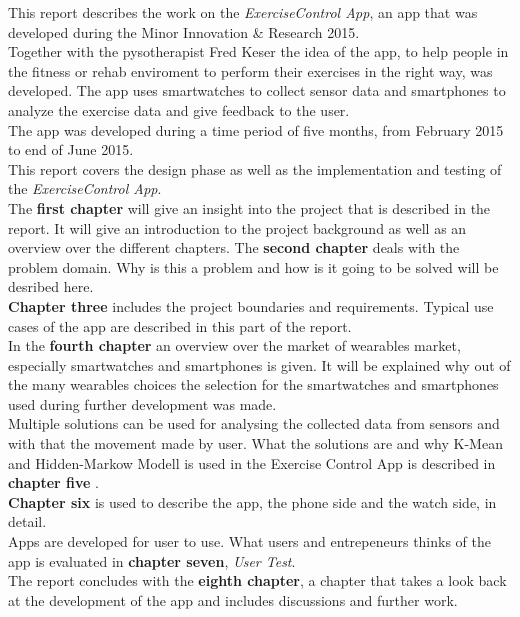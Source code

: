 This report describes the work on the \emph{ExerciseControl App}, an app that was developed during the Minor Innovation \& Research 2015.\\
Together with the pysotherapist Fred Keser the idea of the app, to help people in the fitness or rehab enviroment to perform their exercises in the right way, was developed. The app uses smartwatches to collect sensor data and smartphones to analyze the exercise data and give feedback to the user. \\
The app was developed during a time period of five months, from February 2015 to end of June 2015. \\
This report covers the design phase as well as the implementation and testing of the \emph{ExerciseControl App}.\\
The \textbf{first chapter} will give an insight into the project that is described in the report. It will give an introduction to the project background as well as an overview over the different chapters.
The \textbf{second chapter} deals with the problem domain. Why is this a problem and how is it going to be solved will be desribed here.\\
\textbf{Chapter three} includes the project boundaries and requirements. Typical use cases of the app are described in this part of the report.
\\
In the \textbf{fourth chapter} an overview over the market of wearables market, especially smartwatches and smartphones is given. It will be explained why out of the many wearables choices the selection for the smartwatches and smartphones used during further development was made.
\\
 Multiple solutions can be used for analysing the collected data from sensors and with that the movement made by user. What the solutions are and why K-Mean and Hidden-Markow Modell is used in the Exercise Control App is described in \textbf{chapter five} .
\\
\textbf{Chapter six} is used to describe the app, the phone side and the watch side, in detail.
\\
Apps are developed for user to use. What users and entrepeneurs thinks of the app is evaluated in \textbf{chapter seven}, \emph{User Test}.
\\
The report concludes with the \textbf{eighth chapter}, a chapter that takes a look back at the development of the app and includes discussions and further work.
